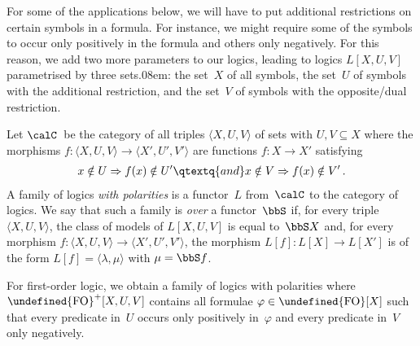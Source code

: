 \documentclass[10pt, fleqn]{scrartcl}
\makeatletter
\newcommand\m@thsm@ller[2]{\mbox{\relscale{0.91}$\m@th#1#2$}}
\let\smaller\undefined
\DeclareRobustCommand\smaller[1]{\relax\ifmmode{\mathpalette\m@thsm@ller{#1}}\else{\relscale{0.91}#1}\fi}
\newcommand*{\FO}{\smaller{\mathrm{FO}}}
\newcommand*{\?}{\kern .08em}
\makeatother
\begin{document}
For some of the applications below, we will have to put additional restrictions on
certain symbols in a formula. For instance, we might require some of the symbols to
occur only positively in the formula and others only negatively.
For this reason, we add two more parameters to our logics, leading
to logics $L[X,U,V]$ parametrised by three sets\?: the set~$X$ of all symbols,
the set~$U$ of symbols with the additional restriction, and the set~$V$ of symbols with
the opposite/dual restriction.
\begin{Def}
Let $\calC$~be the category of all triples $\langle X,U,V\rangle$ of sets with $U,V \subseteq X$
where the morphisms $f : \langle X,U,V\rangle \to \langle X',U',V'\rangle$ are functions
$f : X \to X'$ satisfying
\begin{align*}
  x \notin U \Rightarrow f(x) \notin U'
  \qtextq{and}
  x \notin V \Rightarrow f(x) \notin V'\,.
\end{align*}
A family of logics \emph{with polarities} is a functor~$L$
from~$\calC$ to the category of logics.
We say that such a family is \emph{over} a functor~$\bbS$ if,
for every triple $\langle X,U,V\rangle$, the class of models of $L[X,U,V]$ is equal to~$\bbS X$
and, for every morphism $f : \langle X,U,V\rangle \to \langle X',U',V'\rangle$,
the morphism $L[f] : L[X] \to L[X']$ is of the form $L[f] = \langle\lambda,\mu\rangle$ with
$\mu = \bbS f$.
\end{Def}
\begin{Exam}
For first-order logic, we obtain a family of logics with polarities
where $\FO^+[X,U,V]$ contains all formulae $\varphi \in \FO[X]$ such that every predicate
in~$U$ occurs only positively in~$\varphi$ and every predicate in~$V$ only negatively.
\end{Exam}
\end{document}
